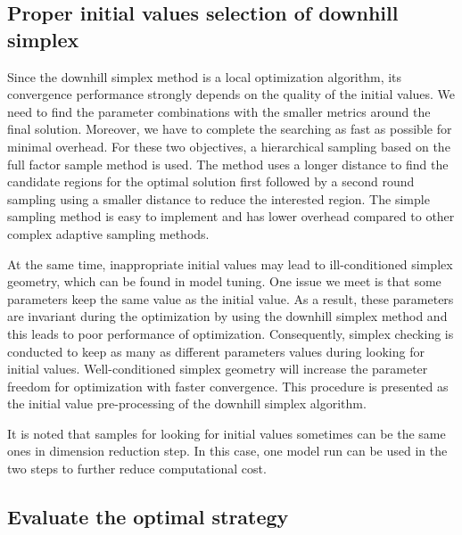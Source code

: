 \documentclass[gmd, manuscript]{copernicus}
\begin{document}
\subsection{Proper initial values selection of downhill simplex}

Since the downhill simplex method is a local optimization algorithm, its convergence performance strongly depends on the quality of the initial values. We need to find the parameter combinations with the smaller metrics around the final solution. Moreover, we have to complete the searching as fast as possible for minimal overhead. For these two objectives, a hierarchical sampling based on the full factor sample method is used. The method uses a longer distance to find the candidate regions for the optimal solution first followed by a second round sampling using a smaller distance to reduce the interested region. The simple sampling method is easy to implement and has lower overhead compared to other complex adaptive sampling methods.


At the same time, inappropriate initial values may lead to ill-conditioned simplex geometry, which can be found in model tuning. One issue we meet is that some parameters keep the same value as the initial value. As a result, these parameters are invariant during the optimization by using the downhill simplex method and this leads to poor performance of optimization. Consequently, simplex checking is conducted to keep as many as different parameters values during looking for initial values. Well-conditioned simplex geometry will increase the parameter freedom for optimization with faster convergence. This procedure is presented as the initial value pre-processing of the downhill simplex algorithm.


It is noted that samples for looking for initial values sometimes can be the same ones in dimension reduction step. In this case, one model run can be used in the two steps to further reduce computational cost.



\subsection{Evaluate the optimal strategy}
\end{document}
